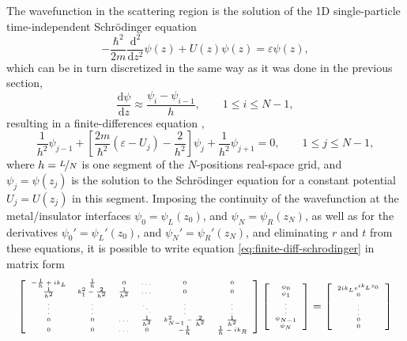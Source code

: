 The wavefunction in the scattering region is the solution of the 1D single-particle time-independent Schr\"odinger equation
\begin{equation}
	-\frac{\hbar^2}{2m}\frac{\mathrm{d}^2}{\mathrm{d}z^2}\psi(z)+U(z)\psi(z)=\varepsilon \psi(z),
	\label{eq:schrodinger}
\end{equation}
which can be in turn discretized in the same way as it was done in the previous section, 
\begin{equation}
	\frac{\mathrm{d}\psi}{\mathrm{d}z}\approx \frac{\psi_i-\psi_{i-1}}{h}, \qquad 1 \leq i \leq N-1, 
\end{equation}
resulting in a finite-differences equation \cite{NR,King},
\begin{equation}
	\frac{1}{h^2}\psi_{j-1}+\left[ \frac{2m}{\hbar^2} (\varepsilon-U_j) - \frac{2}{h^2}\right] \psi_j + \frac{1}{h^2}\psi_{j+1}=0, \qquad 1 \leq j \leq N - 1,
	\label{eq:finite-diff-schrodinger}
\end{equation}
where $h = \nicefrac{L}{N}$ is one segment of the $N$-positions real-space grid, and $\psi_j = \psi(z_j)$ is the solution to the Schr\"odinger equation for a constant potential $U_j = U(z_j)$ in this segment. Imposing the continuity of the wavefunction at the metal/insulator interfaces $\psi_0=\psi_L(z_0)$, and $\psi_N=\psi_R(z_N)$, as well as for the derivatives $\psi_0'=\psi_L'(z_0)$, and $\psi_N'=\psi_R'(z_N)$, and eliminating $r$ and $t$ from these equations, it is possible to write equation \ref{eq:finite-diff-schrodinger} in matrix form
\begin{equation}
	\tiny
		\left[\begin{array}{cccccc}
			-\frac{1}{h}+ik_L & \frac{1}{h} & 0 & \dots & 0 & 0 \\
			\frac{1}{h^2} & k_1^2-\frac{2}{h^2} & \frac{1}{h^2} & \dots & 0 & 0 \\
			\vdots & \vdots & & \ddots & \vdots & \vdots \\
			0 & 0 & \dots & \frac{1}{h^2} & k_{N-1}^2-\frac{2}{h^2} & \frac{1}{h^2} \\
			0 & 0 & \dots & 0 & -\frac{1}{h} & \frac{1}{h}-ik_R
		\end{array}\right]
		\left[\begin{array}{c}
			\psi_0 \\ \psi_1 \\ \vdots \\ \psi_{N-1} \\ \psi_N
		\end{array}\right]
		=
		\left[\begin{array}{c}
			2ik_Le^{ik_Lz_0} \\ 0 \\ \vdots \\ 0 \\ 0
		\end{array}\right]
		\normalsize
		\label{eq:schroedinger-discrete-matrix}
\end{equation}
